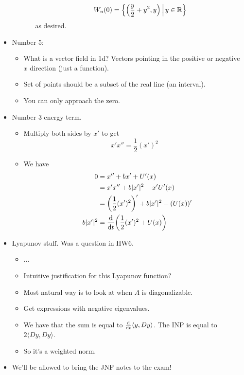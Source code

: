 \documentclass[../notes.tex]{subfiles}
\begin{document}
\begin{itemize}
\begin{itemize}
\begin{itemize}
            \begin{equation*}
                W_u(0) = \left\{ \left( \frac{y}{2}+y^2,y \right) \,\middle|\, y\in\mathbb{R} \right\}
            \end{equation*}
            as desired.
        \end{itemize}
    \end{itemize}
    \item Number 5:
    \begin{itemize}
        \item What is a vector field in 1d? Vectors pointing in the positive or negative $x$ direction (just a function).
        \item Set of points should be a subset of the real line (an interval).
        \item You can only approach the zero.
    \end{itemize}
    \item Number 3 energy term.
    \begin{itemize}
        \item Multiply both sides by $x'$ to get
        \begin{equation*}
            x'x'' = \frac{1}{2}(x')^2
        \end{equation*}
        \item We have
        \begin{align*}
            0 &= x''+bx'+U'(x)\\
            &= x'x''+b|x'|^2+x'U'(x)\\
            &= \left( \frac{1}{2}(x')^2 \right)'+b|x'|^2+(U(x))'\\
            -b|x'|^2 &= \dv{t}(\frac{1}{2}(x')^2+U(x))
        \end{align*}
    \end{itemize}
    \item Lyapunov stuff. Was a question in HW6.
    \begin{itemize}
        \item ...
        \item Intuitive justification for this Lyapunov function?
        \item Most natural way is to look at when $A$ is diagonalizable.
        \item Get expressions with negative eigenvalues.
        \item We have that the sum is equal to $\dv{t}\langle y,Dy \rangle$. The INP is equal to $2\langle Dy,Dy \rangle$.
        \item So it's a weighted norm.
    \end{itemize}
    \item We'll be allowed to bring the JNF notes to the exam!
\end{itemize}
\end{document}
